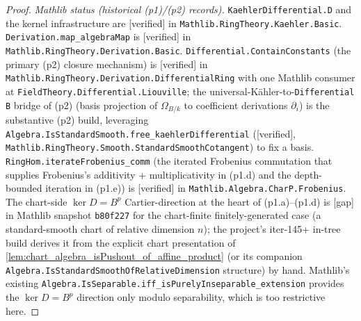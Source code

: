 \begin{proof}
  \emph{Mathlib status (historical (p1)/(p2) records).} \texttt{KaehlerDifferential.D} and the kernel infrastructure are [verified] in \texttt{Mathlib.RingTheory.Kaehler.Basic}. \texttt{Derivation.map\_algebraMap} is [verified] in \texttt{Mathlib.RingTheory.Derivation.Basic}. \texttt{Differential.ContainConstants} (the primary (p2) closure mechanism) is [verified] in \texttt{Mathlib.RingTheory.Derivation.DifferentialRing} with one Mathlib consumer at \texttt{FieldTheory.Differential.Liouville}; the universal-K\"ahler-to-\texttt{Differential B} bridge of (p2) (basis projection of \(\Omega_{B/k}\) to coefficient derivations \(\partial_i\)) is the substantive (p2) build, leveraging \texttt{Algebra.IsStandardSmooth.free\_kaehlerDifferential} ([verified], \texttt{Mathlib.RingTheory.Smooth.StandardSmoothCotangent}) to fix a basis. \texttt{RingHom.iterateFrobenius\_comm} (the iterated Frobenius commutation that supplies Frobenius's additivity + multiplicativity in (p1.d) and the depth-bounded iteration in (p1.e)) is [verified] in \texttt{Mathlib.Algebra.CharP.Frobenius}. The chart-side \(\ker D = B^p\) Cartier-direction at the heart of (p1.a)--(p1.d) is [gap] in Mathlib snapshot \texttt{b80f227} for the chart-finite finitely-generated case (a standard-smooth chart of relative dimension \(n\)); the project's iter-145+ in-tree build derives it from the explicit chart presentation of \cref{lem:chart_algebra_isPushout_of_affine_product} (or its companion \texttt{Algebra.IsStandardSmoothOfRelativeDimension} structure) by hand. Mathlib's existing \texttt{Algebra.IsSeparable.iff\_isPurelyInseparable\_extension} provides the \(\ker D = B^p\) direction only modulo separability, which is too restrictive here.


\end{proof}
